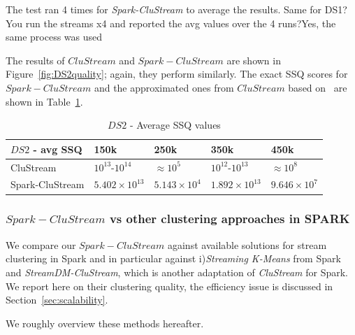 The test ran 4 times for \textit{Spark-CluStream} to average the results. \color{red} Same for DS1? You run the streams x4 and reported the avg values over the 4 runs?\color{black}\color{blue}Yes, the same process was used\color{black}

The results of $CluStream$ and $Spark-CluStream$ are shown in Figure~\ref{fig:DS2quality}; again, they perform similarly. The exact SSQ scores for $Spark-CluStream$ and the approximated ones from $CluStream$ based on~\cite{CluStream} are shown in Table~\ref{tab:DS2quality}.
\begin{table}[t]
\centering
\begin{tabular}{|l|l|l|l|l|}\hline
\textbf{$DS2$ - avg SSQ} & \textbf{150k} & \textbf{250k} & \textbf{350k} & \textbf{450k}\\\hline
CluStream & $10^{13}$-$10^{14}$ & $\approx 10^{5}$ & $10^{12}$-$10^{13}$ & $\approx 10^{8}$\\\hline
Spark-CluStream & $5.402\times10^{13}$ & $5.143\times10^{4}$ & $1.892\times10^{13}$ & $9.646\times10^7$\\\hline
  \end{tabular}
  \caption{$DS2$ - Average SSQ values}
  \label{tab:DS2quality}
\end{table}

\subsubsection{$Spark-CluStream$ vs other clustering approaches in SPARK}
\label{sec:expQuality-vs-SPARK}
We compare our $Spark-CluStream$ against available solutions for stream clustering in Spark and in particular against i)\textit{Streaming K-Means} from Spark and \textit{StreamDM-CluStream}, which is another adaptation of \textit{CluStream} for Spark. We report here on their clustering quality, the efficiency issue is discussed in Section~\ref{sec:scalability}.

We roughly overview these methods hereafter.



